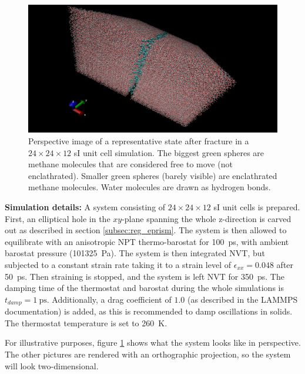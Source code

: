 \begin{figure}
\includegraphics[width=\textwidth]{../pictures/system_1048.pdf}
\caption{Perspective image of a representative state after fracture in a $24\times 24 \times 12$ sI unit cell simulation. The biggest green spheres are methane molecules that are considered free to move (not enclathrated). Smaller green spheres (barely visible) are enclathrated methane molecules. Water molecules are drawn as hydrogen bonds.}
\label{fig:system_1048}
\end{figure}

\begin{framed} 
\textbf{Simulation details:} A system consisting of $24 \times 24\times 12$ sI unit cells is prepared. First, an elliptical hole in the $xy$-plane spanning the whole z-direction is carved out as described in section \ref{subsec:reg_eprism}. The system is then allowed to equilibrate with an anisotropic NPT thermo-barostat for \SI{100}{\pico\second}, with ambient barostat pressure (\SI{101325}{\pascal}). The system is then integrated NVT, but subjected to a constant strain rate taking it to a strain level of $\epsilon_{xx} = 0.048$ after \SI{50}{\pico\second}. Then straining is stopped, and the system is left NVT for \SI{350}{\pico\second}. The damping time of the thermostat and barostat during the whole simulations is $t_{damp} = \SI{1}{\ps}$. Additionally, a drag coefficient of $1.0$ (as described in the LAMMPS documentation) is added, as this is recommended to damp oscillations in solids. The thermostat temperature is set to \SI{260}{\kelvin}.
\end{framed}

For illustrative purposes, figure \ref{fig:system_1048} shows what the system looks like in perspective. The other pictures are rendered with an orthographic projection, so the system will look two-dimensional. 

